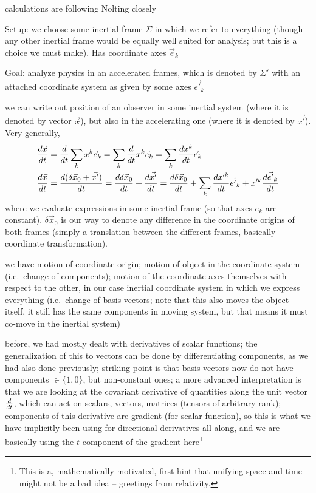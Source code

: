 \documentclass[../class_mech_main.tex]{subfiles}
\begin{document}
calculations are following Nolting closely


Setup: we choose some inertial frame $\Sigma$ in which we refer to everything (though any other inertial frame would be equally well suited for analysis; but this is a choice we must make). Has coordinate axes $\vec{e}_k$

Goal: analyze physics in an accelerated frames, which is denoted by $\Sigma'$ with an attached coordinate system as given by some axes $\vec{e'}_k$


we can write out position of an observer in some inertial system (where it is denoted by vector $\vec{x}$), but also in the accelerating one (where it is denoted by $\vec{x'}$). Very generally,
\begin{align}
    \dv{\vec{x}}{t} &= \dv{t} \sum_k x^k \vec{e}_k = \sum_k \dv{t} x^k \vec{e}_k = \sum_k \dv{x^k}{t} \vec{e}_k
    \\
    \dv{\vec{x}}{t} &= \dv{(\delta \vec{x}_0 + \vec{x'})}{t} = \dv{\delta \vec{x}_0}{t} + \dv{\vec{x'}}{t} = \dv{\delta \vec{x}_0}{t} + \sum_k \dv{x'^k}{t} \vec{e'}_k + x'^k \dv{\vec{e'}_k}{t}
    \label{eq:velocity_accel_frame}
\end{align}
where we evaluate expressions in some inertial frame (so that axes $e_k$ are constant). $\delta \vec{x}_0$ is our way to denote any difference in the coordinate origins of both frames (simply a translation between the different frames, basically coordinate transformation).


we have motion of coordinate origin; motion of object in the coordinate system (i.e.~change of components); motion of the coordinate axes themselves with respect to the other, in our case inertial coordinate system in which we express everything (i.e.~change of basis vectors; note that this also moves the object itself, it still has the same components in moving system, but that means it must co-move in the inertial system)



before, we had mostly dealt with derivatives of scalar functions; the generalization of this to vectors can be done by differentiating components, as we had also done previously; striking point is that basis vectors now do not have components $\in \{1, 0\}$, but non-constant ones; a more advanced interpretation is that we are looking at the covariant derivative of quantities along the unit vector $\dv{t}$, which can act on scalars, vectors, matrices (tensors of arbitrary rank); components of this derivative are gradient (for scalar function), so this is what we have implicitly been using for directional derivatives all along, and we are basically using the $t$-component of the gradient here\footnote{This is a, mathematically motivated, first hint that unifying space and time might not be a bad idea -- greetings from relativity.}
\end{document}
